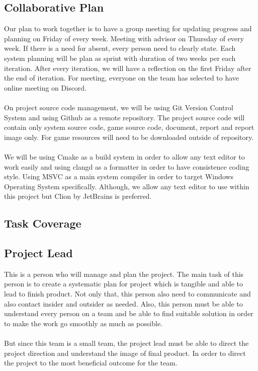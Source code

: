 \begin{multicols}{2}
\raggedcolumns

\subsection{Collaborative Plan}
\label{subsec:collaborative-plan}
Our plan to work together is to have a group meeting for updating progress and planning on Friday of every week.
Meeting with advisor on Thursday of every week.
If there is a need for absent, every person need to clearly state.
Each system planning will be plan as sprint with duration of two weeks per each iteration.
After every iteration, we will have a reflection on the first Friday after the end of iteration.
For meeting, everyone on the team has selected to have online meeting on Discord.
\\\\
On project source code management, we will be using Git Version Control System and using Github as
a remote repository.
The project source code will contain only system source code, game source code, document, report and report image only.
For game resources will need to be downloaded outside of repository.
\\\\
We will be using Cmake as a build system in order to allow any text editor to work easily and using clangd as a formatter
in order to have consistence coding style.
Using MSVC as a main system compiler in order to target Windows Operating System specifically.
Although, we allow any text editor to use within this project but Clion by JetBrains is preferred.

\subsection{Task Coverage}
\label{subsec:task-coverage}

\subsection*{Project Lead}
This is a person who will manage and plan the project.
The main task of this person is to create a systematic plan for project which is tangible and able to lead to finish product.
Not only that, this person also need to communicate and also contact insider and outsider as needed.
Also, this person must be able to understand every person on a team and be able to find suitable solution in order to make
the work go smoothly as much as possible.
\\\\
But since this team is a small team, the project lead must be able to direct the project direction and understand the image
of final product.
In order to direct the project to the most beneficial outcome for the team.


\end{multicols}
